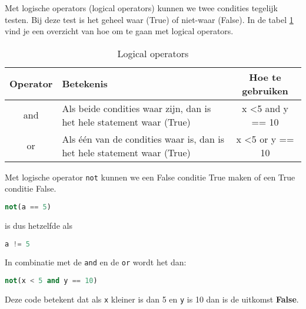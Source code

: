 Met logische operators (logical operators) kunnen we twee condities tegelijk testen. Bij deze test is het geheel waar (True) of niet-waar (False). In de tabel \ref{table:logicop} vind je een overzicht van hoe om te gaan met logical operators.
\begin{flushleft}
\begin{table}[h!]
\centering
\begin{tabularx}{\textwidth}{ |c|X|c| }
\hline
	Operator &
	Betekenis &
	Hoe te gebruiken \\
\hline
	and\index{and}\index{operator!and} &
	Als beide condities waar zijn, dan is het hele statement waar (True) &
	x \textless 5 and y == 10 \\
\hline
	or\index{or}\index{operator!or} &
	Als \'e\'en van de condities waar is, dan is het hele statement waar (True) &
	x \textless 5 or y == 10 \\
\hline
\end{tabularx}
\caption{Logical operators}
\label{table:logicop}
\end{table}
\end{flushleft}

Met logische operator \texttt{not} kunnen we een False conditie True maken of een True conditie False.
\begin{lstlisting}[language=python]
not(a == 5)
\end{lstlisting}
is dus hetzelfde als
\begin{lstlisting}[language=python]
a != 5
\end{lstlisting}
In combinatie met de \texttt{and} en de \texttt{or} wordt het dan:
\begin{lstlisting}[language=python]
not(x < 5 and y == 10)
\end{lstlisting}
Deze code betekent dat als \texttt{x} kleiner is dan 5 en \texttt{y} is 10 dan is de uitkomst \textbf{False}.

